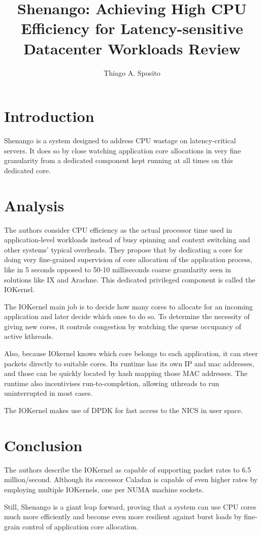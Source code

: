 \documentclass[12pt]{article}
\title{Shenango: Achieving High CPU Efficiency for Latency-sensitive Datacenter Workloads Review}
\author{Thiago A. Sposito\inst{1} }
\begin{document}
 

\maketitle


\section{Introduction}
Shenango is a system designed to address CPU wastage on latency-critical servers. It does so by close watching application core allocations in very fine granularity from a dedicated component kept running at all times on this dedicated core.\cite{ousterhout2019shenango}

\section{Analysis}
The authors consider CPU efficiency as the actual processor time used in application-level workloads instead of busy spinning and context switching and other systems' typical overheads. They propose that by dedicating a core for doing very fine-grained supervision of core allocation of the application process, like in 5    \mu seconds
opposed to 50-10 milliseconds coarse granularity seen in solutions like IX and Arachne. This dedicated privileged component is called the IOKernel.

The IOKernel main job is to decide how many cores to allocate for an incoming application and later decide which ones to do so. To determine the necessity of giving new cores, it controls congestion by watching the queue occupancy of active kthreads.

Also, because IOkernel knows which core belongs to each application, it can steer packets directly to suitable cores. Its runtime has its own IP and mac addresses, and those can be quickly located by hash mapping those MAC addresses. The runtime also incentivises run-to-completion, allowing uthreads to run uninterrupted in most cases.

The IOKernel makes use of DPDK for fast access to the NICS in user space\cite{dpdk}.
\section{Conclusion}
The authors describe the IOKernel as capable of supporting packet rates to 6.5 million/second. Although its successor Caladan \cite{fried2020caladan} is capable of even higher rates by employing multiple IOKernels, one per NUMA machine sockets.

Still, Shenango is a giant leap forward, proving that a system can use CPU cores much more efficiently and become even more resilient against burst loads by fine-grain control of application core allocation.



\end{document}
